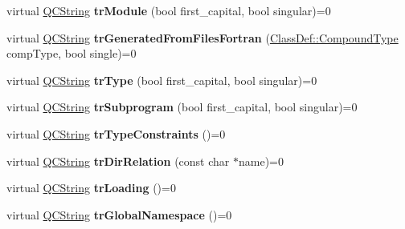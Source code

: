 \begin{DoxyCompactItemize}
\item 
\mbox{\label{class_translator_aacb52f5a80d2ad3e47b983a8d34c4371}} 
virtual \mbox{\hyperlink{class_q_c_string}{Q\+C\+String}} {\bfseries tr\+Module} (bool first\+\_\+capital, bool singular)=0
\item 
\mbox{\label{class_translator_a58bd3fc18bce920201e873ed4338e9a7}} 
virtual \mbox{\hyperlink{class_q_c_string}{Q\+C\+String}} {\bfseries tr\+Generated\+From\+Files\+Fortran} (\mbox{\hyperlink{class_class_def_ae70cf86d35fe954a94c566fbcfc87939}{Class\+Def\+::\+Compound\+Type}} comp\+Type, bool single)=0
\item 
\mbox{\label{class_translator_a1fb2258a8a0fed41d8efec2ab2c88dce}} 
virtual \mbox{\hyperlink{class_q_c_string}{Q\+C\+String}} {\bfseries tr\+Type} (bool first\+\_\+capital, bool singular)=0
\item 
\mbox{\label{class_translator_a8afff623bf7e3a0e950ed28df4abd482}} 
virtual \mbox{\hyperlink{class_q_c_string}{Q\+C\+String}} {\bfseries tr\+Subprogram} (bool first\+\_\+capital, bool singular)=0
\item 
\mbox{\label{class_translator_a3695f44e92e6478f7a4f0aabf7cf37ad}} 
virtual \mbox{\hyperlink{class_q_c_string}{Q\+C\+String}} {\bfseries tr\+Type\+Constraints} ()=0
\item 
\mbox{\label{class_translator_ab2feff71f21ed48a0b49f0e2f37ba695}} 
virtual \mbox{\hyperlink{class_q_c_string}{Q\+C\+String}} {\bfseries tr\+Dir\+Relation} (const char $\ast$name)=0
\item 
\mbox{\label{class_translator_a44cd9d9f06489e63609a980c7218e20c}} 
virtual \mbox{\hyperlink{class_q_c_string}{Q\+C\+String}} {\bfseries tr\+Loading} ()=0
\item 
\mbox{\label{class_translator_aa8d8adf1538babeb7e637ef4dba5549c}} 
virtual \mbox{\hyperlink{class_q_c_string}{Q\+C\+String}} {\bfseries tr\+Global\+Namespace} ()=0
\item 
\mbox{\label{class_translator_a679d91793083e8bda60dbf346aad2623}} 

\end{DoxyCompactItemize}
